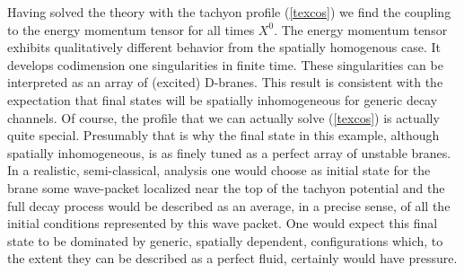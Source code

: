 \documentclass[a4paper,12pt]{article}
\begin{document}
Having solved the theory with the tachyon profile (\ref{texcos}) we find the coupling to the energy momentum tensor for all times $X^0$. The energy momentum tensor exhibits qualitatively different behavior from the spatially homogenous case. 
It develops codimension one singularities in finite time. These singularities can be interpreted as an array of (excited) D-branes. 
This result is consistent with the expectation that final states  will be 
spatially inhomogeneous for generic decay channels. Of course, the profile that we can 
actually solve (\ref{texcos}) is actually quite special. Presumably that is why the
final state in this example, although spatially inhomogeneous, is as finely tuned
as a perfect array of unstable branes. 
In a realistic, semi-classical, analysis one would choose as initial state for the brane some 
wave-packet localized near the top of the tachyon potential and the full decay process
would be described as an average, in a precise sense, of all the initial conditions represented
by this wave packet. One would expect this final state to be dominated by generic,
spatially dependent, configurations which, to the extent they can be described as a perfect 
fluid, certainly would have pressure. 




\end{document}
